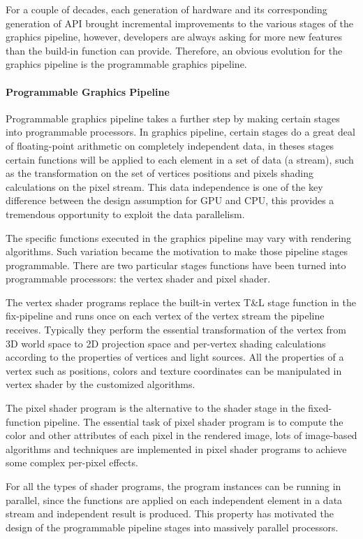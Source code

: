 For a couple of decades, each generation of hardware and its corresponding generation of API brought incremental improvements to the various stages of the graphics pipeline, however, developers are always asking for more new features than the build-in function can provide. Therefore, an obvious evolution for the graphics pipeline is the programmable graphics pipeline.

\paragraph{Programmable Graphics Pipeline}
Programmable graphics pipeline takes a further step by making certain stages into programmable processors. In graphics pipeline, certain stages do a great deal of floating-point arithmetic on completely independent data, in theses stages certain functions will be applied to each element in a set of data (a stream), such as the transformation on the set of vertices positions and pixels shading calculations on the pixel stream. This data independence is one of the key difference between the design assumption for GPU and CPU, this provides a tremendous opportunity to exploit the data parallelism. 

The specific functions executed in the graphics pipeline may vary with rendering algorithms. Such variation became the motivation to make those pipeline stages programmable. There are two particular stages functions have been turned into programmable processors: the vertex shader and pixel shader. 

The vertex shader programs replace the built-in vertex T\&L stage function in the fix-pipeline and runs once on each vertex of the vertex stream the pipeline receives. Typically they perform the essential transformation of the vertex from 3D world space to 2D projection space and per-vertex shading calculations  according to the properties of vertices and light sources. All the properties of a vertex such as positions, colors and texture coordinates can be manipulated in vertex shader by the customized algorithms.   

The pixel shader program is the alternative to the shader stage in the fixed-function pipeline. The essential task of pixel shader program is to compute the color and other attributes of each pixel in the rendered image, lots of image-based algorithms and techniques are implemented in pixel shader programs to achieve some complex per-pixel effects. 

For all the types of shader programs, the program instances can be running in parallel, since the functions are applied on each independent element in a data stream and independent result is produced. This property has motivated the design of the programmable pipeline stages into massively parallel processors.   


